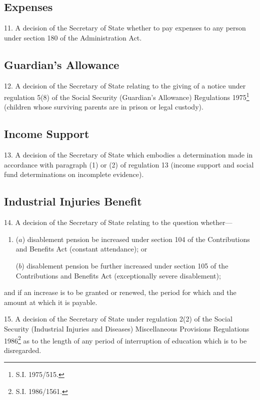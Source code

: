 \documentclass[12pt,a4paper]{article}
\begin{document}
\subsection*{Expenses}

11.  A decision of the Secretary of State whether to pay expenses to any person under section 180 of the Administration Act.

\subsection*{Guardian’s Allowance}

12.  A decision of the Secretary of State relating to the giving of a notice under regulation 5(8) of the Social Security (Guardian’s Allowance) Regulations 1975\footnote{\frenchspacing S.I. 1975/515.} (children whose surviving parents are in prison or legal custody).

\subsection*{Income Support}

13.  A decision of the Secretary of State which embodies a determination made in accordance with paragraph (1) or (2) of regulation 13 (income support and social fund determinations on incomplete evidence).

\subsection*{Industrial Injuries Benefit}

14.  A decision of the Secretary of State relating to the question whether—
\begin{enumerate}\item[]
($a$) disablement pension be increased under section 104 of the Contributions and Benefits Act (constant attendance); or

($b$) disablement pension be further increased under section 105 of the Contributions and Benefits Act (exceptionally severe disablement);
\end{enumerate}
and if an increase is to be granted or renewed, the period for which and the amount at which it is payable.

\medskip

15.  A decision of the Secretary of State under regulation 2(2) of the Social Security (Industrial Injuries and Diseases) Miscellaneous Provisions Regulations 1986\footnote{\frenchspacing S.I. 1986/1561.} as to the length of any period of interruption of education which is to be disregarded.
\end{document}
